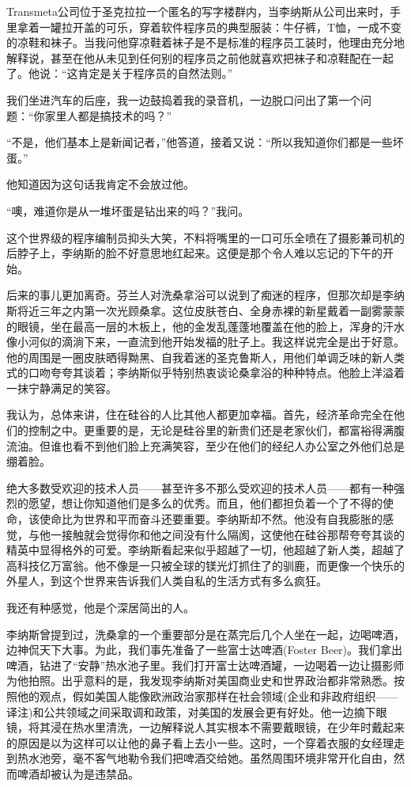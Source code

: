 Transmeta公司位于圣克拉拉一个匿名的写字楼群内，当李纳斯从公司出来时，手里拿着一罐拉开盖的可乐，穿着软件程序员的典型服装：牛仔裤，T恤，一成不变的凉鞋和袜子。当我问他穿凉鞋着袜子是不是标准的程序员工装时，他理由充分地解释说，甚至在他从未见到任何别的程序员之前他就喜欢把袜子和凉鞋配在一起了。他说：“这肯定是关于程序员的自然法则。”

我们坐进汽车的后座，我一边鼓捣着我的录音机，一边脱口问出了第一个问题：“你家里人都是搞技术的吗？”

“不是，他们基本上是新闻记者，”他答道，接着又说：“所以我知道你们都是一些坏蛋。”

他知道因为这句话我肯定不会放过他。

“噢，难道你是从一堆坏蛋是钻出来的吗？”我问。

这个世界级的程序编制员抑头大笑，不料将嘴里的一口可乐全喷在了摄影兼司机的后脖子上，李纳斯的脸不好意思地红起来。这便是那个令人难以忘记的下午的开始。

后来的事儿更加离奇。芬兰人对洗桑拿浴可以说到了痴迷的程序，但那次却是李纳斯将近三年之内第一次光顾桑拿。这位皮肤苍白、全身赤裸的新星戴着一副雾蒙蒙的眼镜，坐在最高一层的木板上，他的金发乱蓬蓬地覆盖在他的脸上，浑身的汗水像小河似的滴淌下来，一直流到他开始发福的肚子上。我这样说完全是出于好意。他的周围是一圈皮肤晒得黝黑、自我着迷的圣克鲁斯人，用他们单调乏味的新人类式的口吻夸夸其谈着；李纳斯似乎特别热衷谈论桑拿浴的种种特点。他脸上洋溢着一抹宁静满足的笑容。

我认为，总体来讲，住在硅谷的人比其他人都更加幸福。首先，经济革命完全在他们的控制之中。更重要的是，无论是硅谷里的新贵们还是老家伙们，都富裕得满腹流油。但谁也看不到他们脸上充满笑容，至少在他们的经纪人办公室之外他们总是绷着脸。

绝大多数受欢迎的技术人员——甚至许多不那么受欢迎的技术人员——都有一种强烈的愿望，想让你知道他们是多么的优秀。而且，他们都担负着一个了不得的使命，该使命比为世界和平而奋斗还要重要。李纳斯却不然。他没有自我膨胀的感觉，与他一接触就会觉得你和他之间没有什么隔阂，这使他在硅谷那帮夸夸其谈的精英中显得格外的可爱。李纳斯看起来似乎超越了一切，他超越了新人类，超越了高科技亿万富翁。他不像是一只被全球的镁光灯抓住了的驯鹿，而更像一个快乐的外星人，到这个世界来告诉我们人类自私的生活方式有多么疯狂。

我还有种感觉，他是个深居简出的人。

李纳斯曾提到过，洗桑拿的一个重要部分是在蒸完后几个人坐在一起，边喝啤酒，边神侃天下大事。为此，我们事先准备了一些富士达啤酒(Foster Beer)。我们拿出啤酒，钻进了“安静”热水池子里。我们打开富士达啤酒罐，一边喝着一边让摄影师为他拍照。出乎意料的是，我发现李纳斯对美国商业史和世界政治都非常熟悉。按照他的观点，假如美国人能像欧洲政治家那样在社会领域(企业和非政府组织——译注)和公共领域之间采取调和政策，对美国的发展会更有好处。他一边摘下眼镜，将其浸在热水里清洗，一边解释说人其实根本不需要戴眼镜，在少年时戴起来的原因是以为这样可以让他的鼻子看上去小一些。这时，一个穿着衣服的女经理走到热水池旁，毫不客气地勒令我们把啤酒交给她。虽然周围环境非常开化自由，然而啤酒却被认为是违禁品。

